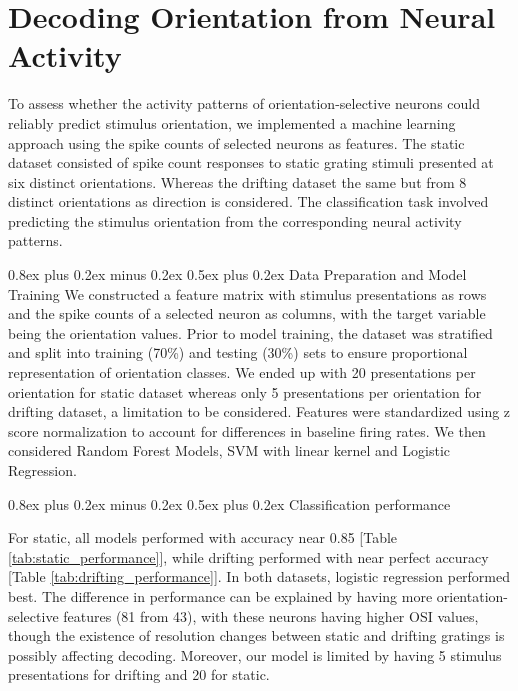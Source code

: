 \documentclass[10pt,twocolumn]{article}
\makeatletter
\renewcommand{\subsection}{\@startsection{subsection}{2}{\z@}%
  {0.8ex plus 0.2ex minus 0.2ex}%
  {0.5ex plus 0.2ex}%
{\normalfont\normalsize\bfseries}}
\makeatother
\begin{document}
\section{Decoding Orientation from Neural Activity}

To assess whether the activity patterns of orientation-selective neurons could reliably predict stimulus orientation, we implemented a machine learning approach using the spike counts of selected neurons as features. The static dataset consisted of spike count responses to static grating stimuli presented at six distinct orientations. Whereas the drifting dataset the same but from 8 distinct orientations as direction is considered. The classification task involved predicting the stimulus orientation from the corresponding neural activity patterns.

\subsection{Data Preparation and Model Training}
We constructed a feature matrix with stimulus presentations as rows and the spike counts of a selected neuron as columns, with the target variable being the orientation values. Prior to model training, the dataset was stratified and split into training (70\%) and testing (30\%) sets to ensure proportional representation of orientation classes. We ended up with 20 presentations per orientation for static dataset whereas only 5 presentations per orientation for drifting dataset, a limitation to be considered. Features were standardized using z score normalization to account for differences in baseline firing rates. We then considered Random Forest Models, SVM with linear kernel and Logistic Regression.

\subsection{Classification performance}

For static, all models performed with accuracy near 0.85 [Table \ref{tab:static_performance}], while drifting performed with near perfect accuracy [Table \ref{tab:drifting_performance}]. In both datasets, logistic regression performed best. The difference in performance can be explained by having more orientation-selective features (81 from 43), with these neurons having higher OSI values, though the existence of resolution changes between static and drifting gratings is possibly affecting decoding. Moreover, our model is limited by having 5 stimulus presentations for drifting and 20 for static.
\end{document}
